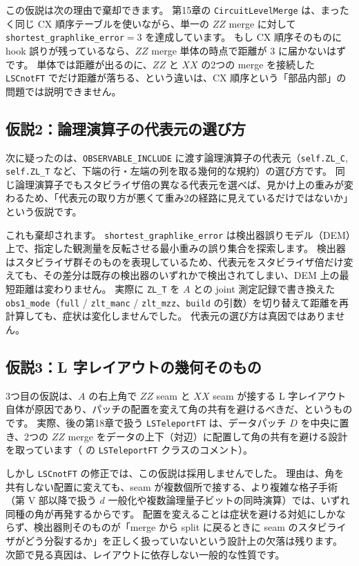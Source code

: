 この仮説は次の理由で棄却できます。
第15章の \texttt{CircuitLevelMerge} は、まったく同じ CX 順序テーブルを使いながら、単一の $ZZ$ merge に対して \texttt{shortest\_graphlike\_error}$=3$ を達成しています。
もし CX 順序そのものに hook 誤りが残っているなら、$ZZ$ merge 単体の時点で距離が $3$ に届かないはずです。
単体では距離が出るのに、$ZZ$ と $XX$ の2つの merge を接続した \texttt{LSCnotFT} でだけ距離が落ちる、という違いは、CX 順序という「部品内部」の問題では説明できません。

\subsection{仮説2：論理演算子の代表元の選び方}

次に疑ったのは、\texttt{OBSERVABLE\_INCLUDE} に渡す論理演算子の代表元（\texttt{self.ZL\_C}, \texttt{self.ZL\_T} など、下端の行・左端の列を取る幾何的な規約）の選び方です。
同じ論理演算子でもスタビライザ倍の異なる代表元を選べば、見かけ上の重みが変わるため、「代表元の取り方が悪くて重み2の経路に見えているだけではないか」という仮説です。

これも棄却されます。
\texttt{shortest\_graphlike\_error} は検出器誤りモデル（DEM）上で、指定した観測量を反転させる最小重みの誤り集合を探索します。
検出器はスタビライザ群そのものを表現しているため、代表元をスタビライザ倍だけ変えても、その差分は既存の検出器のいずれかで検出されてしまい、DEM 上の最短距離は変わりません。
実際に \texttt{ZL\_T} を $A$ との joint 測定記録で書き換えた \texttt{obs1\_mode}（\texttt{full} / \texttt{zlt\_manc} / \texttt{zlt\_mzz}、\texttt{build} の引数）を切り替えて距離を再計算しても、症状は変化しませんでした。
代表元の選び方は真因ではありません。

\subsection{仮説3：L 字レイアウトの幾何そのもの}

3つ目の仮説は、$A$ の右上角で $ZZ$ seam と $XX$ seam が接する L 字レイアウト自体が原因であり、パッチの配置を変えて角の共有を避けるべきだ、というものです。
実際、後の第18章で扱う \texttt{LSTeleportFT} は、データパッチ $D$ を中央に置き、2つの $ZZ$ merge をデータの上下（対辺）に配置して角の共有を避ける設計を取っています（ の \texttt{LSTeleportFT} クラスのコメント）。

しかし \texttt{LSCnotFT} の修正では、この仮説は採用しませんでした。
理由は、角を共有しない配置に変えても、seam が複数個所で接する、より複雑な格子手術（第 V 部以降で扱う $d$ 一般化や複数論理量子ビットの同時演算）では、いずれ同種の角が再発するからです。
配置を変えることは症状を避ける対処にしかならず、検出器則そのものが「merge から split に戻るときに seam のスタビライザがどう分裂するか」を正しく扱っていないという設計上の欠落は残ります。
次節で見る真因は、レイアウトに依存しない一般的な性質です。

